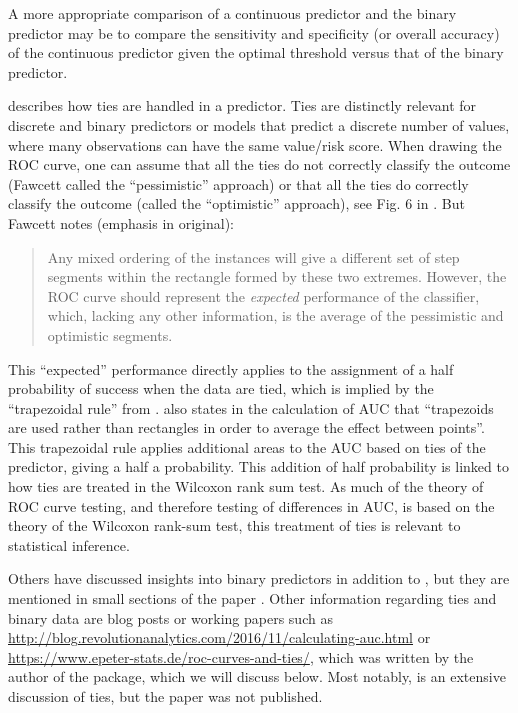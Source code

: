 \documentclass[article]{jss}
\begin{document}
A more appropriate comparison of a continuous predictor and the binary
predictor may be to compare the sensitivity and specificity (or overall
accuracy) of the continuous predictor given the optimal threshold versus
that of the binary predictor.

\citet{fawcett2006introduction} describes how ties are handled in a
predictor. Ties are distinctly relevant for discrete and binary
predictors or models that predict a discrete number of values, where
many observations can have the same value/risk score. When drawing the
ROC curve, one can assume that all the ties do not correctly classify
the outcome (Fawcett called the ``pessimistic'' approach) or that all
the ties do correctly classify the outcome (called the ``optimistic''
approach), see Fig. 6 in \citep{fawcett2006introduction}. But Fawcett
notes (emphasis in original):

\begin{quote}
Any mixed ordering of the instances will give a different set of step
segments within the rectangle formed by these two extremes. However, the
ROC curve should represent the \emph{expected} performance of the
classifier, which, lacking any other information, is the average of the
pessimistic and optimistic segments.
\end{quote}

This ``expected'' performance directly applies to the assignment of a
half probability of success when the data are tied, which is implied by
the ``trapezoidal rule'' from \citet{hanley1982meaning}.
\citet{fawcett2006introduction} also states in the calculation of AUC
that ``trapezoids are used rather than rectangles in order to average
the effect between points''. This trapezoidal rule applies additional
areas to the AUC based on ties of the predictor, giving a half a
probability. This addition of half probability is linked to how ties are
treated in the Wilcoxon rank sum test. As much of the theory of ROC
curve testing, and therefore testing of differences in AUC, is based on
the theory of the Wilcoxon rank-sum test, this treatment of ties is
relevant to statistical inference.

Others have discussed insights into binary predictors in addition to
\citet{fawcett2006introduction}, but they are mentioned in small
sections of the paper \citep{saito2015precision, pepe2009estimation}.
Other information regarding ties and binary data are blog posts or
working papers such as
\url{http://blog.revolutionanalytics.com/2016/11/calculating-auc.html}
or \url{https://www.epeter-stats.de/roc-curves-and-ties/}, which was
written by the author of the  \citep{fbroc} package, which we
will discuss below. Most notably, \citet{hsu2014inference} is an
extensive discussion of ties, but the paper was not published.
\end{document}
